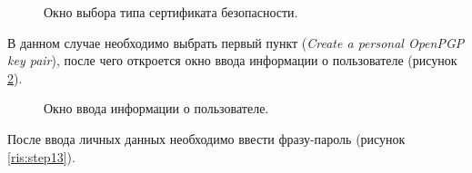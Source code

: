 \documentclass[10pt,a4paper]{report}
\begin{document}
\begin{figure}[h]
	\caption{Окно выбора типа сертификата безопасности.}
	\label{ris:step11}
\end{figure}

В данном случае необходимо выбрать первый пункт (\textit{Create a personal OpenPGP key pair}), после чего откроется окно ввода информации о пользователе (рисунок \ref{ris:step12}).

\begin{figure}[h]
	\caption{Окно ввода информации о пользователе.}
	\label{ris:step12}
\end{figure}

После ввода личных данных необходимо ввести фразу-пароль (рисунок \ref{ris:step13}).
\end{document}
